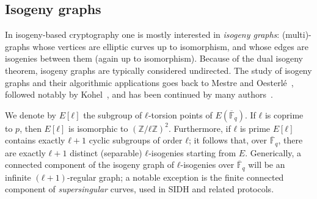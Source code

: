 \documentclass{article}
\newcommand{\Fbar}{\overline{\mathbb{F}}}
\theoremstyle{definition}
\begin{document}
\subsection{Isogeny graphs}

In isogeny-based cryptography one is mostly interested in
\emph{isogeny graphs}: (multi)-graphs whose vertices are
elliptic curves up to isomorphism, and whose edges are isogenies
between them (again up to isomorphism).
Because of the dual isogeny theorem, isogeny graphs are typically
considered undirected.
The study of isogeny graphs and their algorithmic applications 
goes back to Mestre and Oesterlé~\cite{Mestre},
followed notably by Kohel~\cite{kohel},
and has been continued by many
authors~\cite{Gal,fouquet+morain02,GHS,MiretMSTV06,jao+miller+venkatesan09}.

We denote by $E[ℓ]$ the subgroup of $ℓ$-torsion points of
$E(\Fbar_q)$.  If $ℓ$ is coprime to $p$, then $E[ℓ]$ is isomorphic to
$(ℤ/ℓℤ)^2$.  Furthermore, if $ℓ$ is prime $E[ℓ]$ contains exactly
$ℓ+1$ cyclic subgroups of order $ℓ$; it follows that, over $\Fbar_q$,
there are exactly $ℓ+1$ distinct (separable) $ℓ$-isogenies starting
from $E$.  Generically, a connected component of the isogeny graph of
$ℓ$-isogenies over $\Fbar_q$ will be an infinite $(ℓ+1)$-regular
graph; a notable exception is the finite connected component of
\emph{supersingular} curves, used in SIDH and related protocols.
\end{document}
